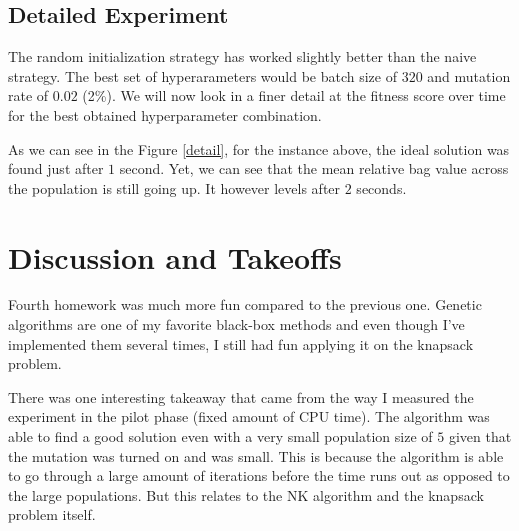\documentclass[a4paper,10pt]{article}
\begin{document}
\subsection{Detailed Experiment}

The random initialization strategy has worked slightly better than the naive strategy. The best set of hyperarameters would be batch size of $320$ and mutation rate of $0.02$ (2\%). We will now look in a finer detail at the fitness score over time for the best obtained hyperparameter combination.

As we can see in the Figure \ref{detail}, for the instance above, the ideal solution was found just after $1$ second. Yet, we can see that the mean relative bag value across the population is still going up. It however levels after $2$ seconds.

\clearpage
\section{Discussion and Takeoffs}

Fourth homework was much more fun compared to the previous one. Genetic algorithms are one of my favorite black-box methods and even though I've implemented them several times, I still had fun applying it on the knapsack problem.

There was one interesting takeaway that came from the way I measured the experiment in the pilot phase (fixed amount of CPU time). The algorithm was able to find a good solution even with a very small population size of $5$ given that the mutation was turned on and was small. This is because the algorithm is able to go through a large amount of iterations before the time runs out as opposed to the large populations. But this relates to the NK algorithm and the knapsack problem itself.
\end{document}
